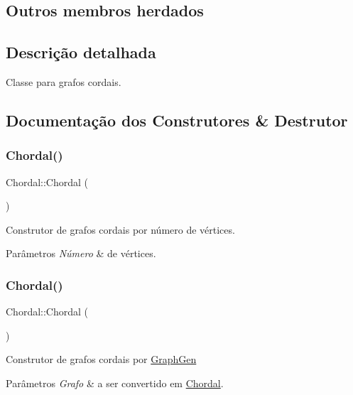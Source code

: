 \subsection*{Outros membros herdados}


\subsection{Descrição detalhada}
Classe para grafos cordais. 

\subsection{Documentação dos Construtores \& Destrutor}
\mbox{\label{classChordal_af315e26462665f1881975cc27372a67a}} 
\subsubsection{\texorpdfstring{Chordal()}{Chordal()}\hspace{0.1cm}{\footnotesize\ttfamily [1/2]}}
{\footnotesize\ttfamily Chordal\+::\+Chordal (\begin{DoxyParamCaption}\item[{int}]{ }\end{DoxyParamCaption})}

Construtor de grafos cordais por número de vértices. 
\begin{DoxyParams}{Parâmetros}
{\em Número} & de vértices. \\
\hline
\end{DoxyParams}
\mbox{\label{classChordal_a6ab51b523f1b150560fcae74db9eee68}} 
\subsubsection{\texorpdfstring{Chordal()}{Chordal()}\hspace{0.1cm}{\footnotesize\ttfamily [2/2]}}
{\footnotesize\ttfamily Chordal\+::\+Chordal (\begin{DoxyParamCaption}\item[{\mbox{\hyperlink{classGraphGen}{Graph\+Gen}} \&}]{ }\end{DoxyParamCaption})}

Construtor de grafos cordais por \mbox{\hyperlink{classGraphGen}{Graph\+Gen}} 
\begin{DoxyParams}{Parâmetros}
{\em Grafo} & a ser convertido em \mbox{\hyperlink{classChordal}{Chordal}}. \\
\hline
\end{DoxyParams}


